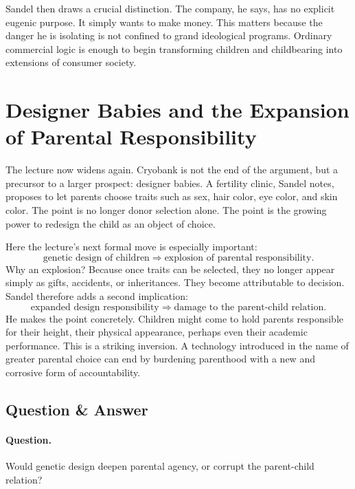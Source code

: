 Sandel then draws a crucial distinction. The company, he says, has no explicit eugenic purpose. It simply wants to make money. This matters because the danger he is isolating is not confined to grand ideological programs. Ordinary commercial logic is enough to begin transforming children and childbearing into extensions of consumer society.

\section{Designer Babies and the Expansion of Parental Responsibility}

The lecture now widens again. Cryobank is not the end of the argument, but a precursor to a larger prospect: designer babies. A fertility clinic, Sandel notes, proposes to let parents choose traits such as sex, hair color, eye color, and skin color. The point is no longer donor selection alone. The point is the growing power to redesign the child as an object of choice.

Here the lecture's next formal move is especially important:
\begin{equation}
\text{genetic design of children}
\Longrightarrow
\text{explosion of parental responsibility}.
\end{equation}
Why an explosion? Because once traits can be selected, they no longer appear simply as gifts, accidents, or inheritances. They become attributable to decision. Sandel therefore adds a second implication:
\begin{equation}
\text{expanded design responsibility}
\Longrightarrow
\text{damage to the parent-child relation}.
\end{equation}
He makes the point concretely. Children might come to hold parents responsible for their height, their physical appearance, perhaps even their academic performance. This is a striking inversion. A technology introduced in the name of greater parental choice can end by burdening parenthood with a new and corrosive form of accountability.

\subsection{Question \& Answer}

\paragraph{Question.} Would genetic design deepen parental agency, or corrupt the parent-child relation?

